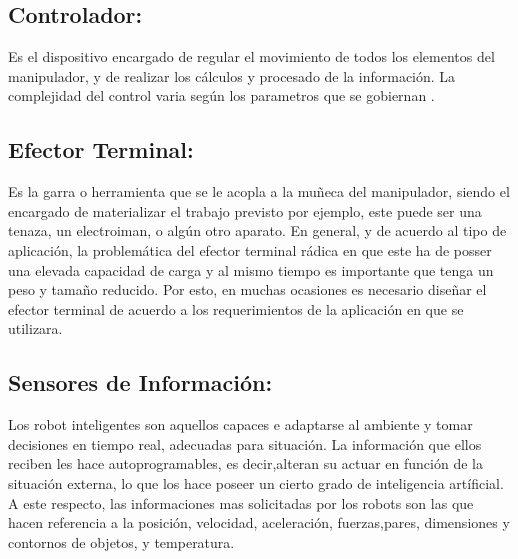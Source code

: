 \documentclass[14pt,a4paper]{article}
\begin{document}
\subsection{Controlador:}
Es el dispositivo encargado de regular el movimiento de todos los elementos del manipulador, y de realizar los cálculos y procesado de la información. La complejidad del control varia según los parametros que se gobiernan \citep{cardenas2015diseno}.
\subsection{Efector Terminal:}
Es la garra o herramienta que se le acopla a la muñeca del manipulador, siendo el encargado de materializar el trabajo previsto por ejemplo, este puede ser una tenaza, un electroiman, o algún otro aparato. En general, y de acuerdo al tipo de aplicación, la problemática del efector terminal rádica en que este ha de posser una elevada capacidad de carga y al mismo tiempo es importante que tenga un peso y tamaño reducido. Por esto, en muchas ocasiones es necesario diseñar el efector terminal de acuerdo a los requerimientos de la aplicación en que se utilizara.
\subsection{Sensores de Información:}
Los robot inteligentes son aquellos capaces e adaptarse al ambiente y tomar decisiones en tiempo real, adecuadas para situación. La información que ellos reciben les hace autoprogramables, es decir,alteran su actuar en función de la situación externa, lo que los hace poseer un cierto grado de inteligencia artíficial. A este respecto, las informaciones mas solicitadas por los robots son las que hacen referencia a la posición, velocidad, aceleración, fuerzas,pares, dimensiones y contornos de objetos, y temperatura.
\end{document}
